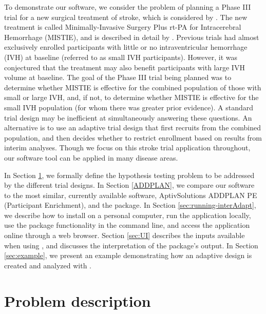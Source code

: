 \documentclass[article]{jss}
\begin{document}
To demonstrate our software, we consider the problem of 
 planning a Phase III trial for a new surgical treatment of stroke, which is considered by \cite{Rosenblum2013AdaptMISTIE}.
The new treatment is  called Minimally-Invasive Surgery Plus rt-PA for Intracerebral Hemorrhage (MISTIE), and is described in detail by \cite{MISTIE_prelim2008}. 
Previous trials had almost exclusively enrolled participants with little or no intraventricular hemorrhage (IVH) at baseline (referred to as small IVH participants).
However, it was conjectured that the treatment may also benefit  participants with large IVH volume at baseline.  
The goal of the Phase III trial being planned was to determine whether MISTIE is effective for the combined population of those with small or large IVH, and, if not, to determine whether MISTIE is effective for the small IVH population (for whom there was greater prior evidence). A  standard trial design  may be inefficient at simultaneously answering these questions.
An alternative is to use an adaptive trial design that  first recruits from the combined population, and then decides whether to restrict enrollment based on results from interim  analyses. 
Though we focus on this stroke trial application throughout, our software tool can be applied in many disease areas.


In Section \ref{sec:problemDescription}, we  formally define the hypothesis testing problem to be addressed by the different trial designs. In Section \ref{ADDPLAN}, we compare our software to the most similar, currently available software, AptivSolutions ADDPLAN PE (Participant Enrichment), and the   package. 
In Section \ref{sec:running-interAdapt}, we describe how to install  on a personal computer, run the  application locally, use the package functionality in the command line, and access the application online through a web browser. Section \ref{sec:UI} describes the inputs available when using , and discusses the interpretation of the package's output. In Section \ref{sec:example}, we present an example demonstrating how an adaptive design is created and analyzed with . 

\section{Problem description}
\label{sec:problemDescription}
\end{document}
